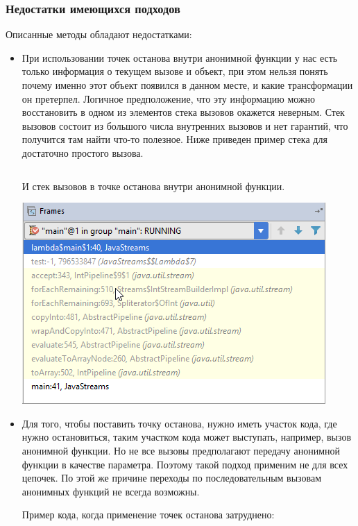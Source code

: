 \subsubsection{Недостатки имеющихся подходов}
Описанные методы обладают недостатками:
\begin{itemize}
	\item При использовании точек останова внутри анонимной функции у нас есть только информация о текущем вызове и объект, при этом нельзя понять почему именно этот объект появился в данном месте, и какие трансформации он претерпел. Логичное предположение, что эту информацию можно восстановить в одном из элементов стека вызовов окажется неверным. Стек вызовов состоит из большого числа внутренних вызовов и нет гарантий, что получится там найти что-то полезное. Ниже приведен пример стека для достаточно простого вызова.
	\inputminted{java}{chapter1/code/SimplestStreamExample.java}
	
	И стек вызовов в точке останова внутри анонимной функции.
	
	\includegraphics[scale=1.]{chapter1/img/stack.png}
	
	\item Для того, чтобы поставить точку останова, нужно иметь участок кода, где нужно остановиться, таким участком кода может выступать, например, вызов анонимной функции. Но не все вызовы предполагают передачу анонимной функции в качестве параметра. Поэтому такой подход применим не для всех цепочек. По этой же причине переходы по последовательным вызовам анонимных функций не всегда возможны.
	
	Пример кода, когда применение точек останова затруднено: \inputminted{java}{chapter1/code/HardToUseBreakpoint.java}
\end{itemize}

